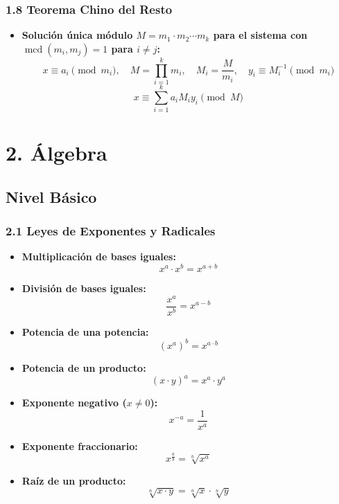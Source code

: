 \documentclass[11pt,a4paper]{article}
\begin{document}
\subsubsection*{1.8 Teorema Chino del Resto}

\begin{itemize}
  \item \textbf{Solución única módulo $M = m_1 \cdot m_2 \cdots m_k$ para el sistema con $\operatorname{mcd}(m_i, m_j) = 1$ para $i \ne j$:}
  \[
    x \equiv a_i \pmod{m_i}, \quad M = \prod_{i=1}^k m_i, \quad M_i = \frac{M}{m_i}, \quad y_i \equiv M_i^{-1} \pmod{m_i}
  \]
  \[
    x \equiv \sum_{i=1}^k a_i M_i y_i \pmod{M}
  \]
\end{itemize}

\section*{2. Álgebra}

\subsection*{Nivel Básico}

\subsubsection*{2.1 Leyes de Exponentes y Radicales}

\begin{itemize}
  \item \textbf{Multiplicación de bases iguales:}
  \[
    x^a \cdot x^b = x^{a + b}
  \]
  \item \textbf{División de bases iguales:}
  \[
    \frac{x^a}{x^b} = x^{a - b}
  \]
  \item \textbf{Potencia de una potencia:}
  \[
    (x^a)^b = x^{a \cdot b}
  \]
  \item \textbf{Potencia de un producto:}
  \[
    (x \cdot y)^a = x^a \cdot y^a
  \]
  \item \textbf{Exponente negativo ($x \ne 0$):}
  \[
    x^{-a} = \frac{1}{x^a}
  \]
  \item \textbf{Exponente fraccionario:}
  \[
    x^{\frac{a}{b}} = \sqrt[b]{x^a}
  \]
  \item \textbf{Raíz de un producto:}
  \[
    \sqrt[n]{x \cdot y} = \sqrt[n]{x} \cdot \sqrt[n]{y}
  \]
\end{itemize}
\end{document}
